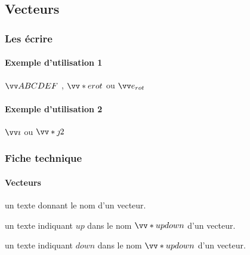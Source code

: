 \documentclass[12pt,a4paper]{article}
\begin{document}

\subsection{Vecteurs}

\subsubsection{Les écrire}

\paragraph{Exemple d'utilisation 1}

\begin{latexex}
$\vect{ABCDEF}$  ,
$\vect*{e}{rot}$ ou
$\vect{e_{rot}}$
\end{latexex}




\paragraph{Exemple d'utilisation 2}

\begin{latexex}
$\vect{i}$ ou
$\vect*{j}{2}$
\end{latexex}




\subsubsection{Fiche technique}

\paragraph{Vecteurs}


\IDarg{} un texte donnant le nom d'un vecteur.


\separation



 un texte indiquant $up$ dans le nom $\vect*{up}{down}$ d'un vecteur.

 un texte indiquant $down$ dans le nom $\vect*{up}{down}$ d'un vecteur.
\end{document}

